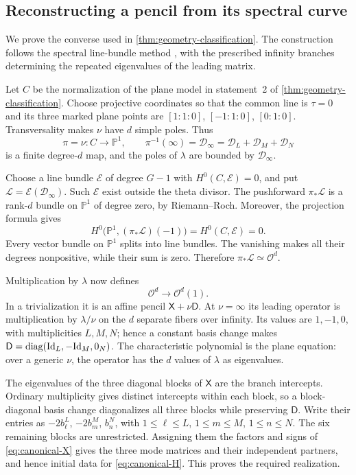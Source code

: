 \subsection{Reconstructing a pencil from its spectral curve}
\label{sec:geometry-converse}

We prove the converse used in \cref{thm:geometry-classification}.
The construction follows the spectral line-bundle method
\cite[\S1]{Beauville1990}, with the prescribed infinity branches
determining the repeated eigenvalues of the leading matrix.

Let $C$ be the normalization of the plane model in statement~2 of
\cref{thm:geometry-classification}. Choose projective coordinates so
that the common line is $\tau=0$ and its three marked plane points
are $[1:1:0]$, $[-1:1:0]$, $[0:1:0]$.
Transversality makes $\nu$ have $d$ simple poles. Thus
\[
 \pi=\nu:C\longrightarrow\mathbb P^1,\qquad
 \pi^{-1}(\infty)=\mathcal D_\infty
 =\mathcal D_L+\mathcal D_M+\mathcal D_N
\]
is a finite degree-$d$ map, and the poles of $\lambda$ are bounded
by $\mathcal D_\infty$.

Choose a line bundle $\mathcal E$ of degree $G-1$ with
$H^0(C,\mathcal E)=0$, and put
$\mathcal L=\mathcal E(\mathcal D_\infty)$. Such $\mathcal E$
exist outside the theta divisor. The pushforward $\pi_*\mathcal L$
is a rank-$d$ bundle on $\mathbb P^1$ of degree zero, by
Riemann--Roch. Moreover, the projection formula gives
\[
 H^0\bigl(\mathbb P^1,(\pi_*\mathcal L)(-1)\bigr)
 =H^0(C,\mathcal E)=0.
\]
Every vector bundle on $\mathbb P^1$ splits into line bundles.
The vanishing makes all their degrees nonpositive, while their sum
is zero. Therefore $\pi_*\mathcal L\simeq\mathcal O^{d}$.

Multiplication by $\lambda$ now defines
\[
 \mathcal O^{d}\longrightarrow\mathcal O^{d}(1).
\]
In a trivialization it is an affine pencil $\mathsf X+\nu\mathsf D$.
At $\nu=\infty$ its leading operator is multiplication by
$\lambda/\nu$ on the $d$ separate fibers over infinity. Its values
are $1,-1,0$, with multiplicities $L,M,N$; hence a constant basis
change makes $\mathsf D=\operatorname{diag}(\mathrm{Id}_L,-\mathrm{Id}_M,0_N)$.
The characteristic polynomial is the plane equation: over a generic
$\nu$, the operator has the $d$ values of $\lambda$ as eigenvalues.

The eigenvalues of the three diagonal blocks of $\mathsf X$ are
the branch intercepts. Ordinary multiplicity gives distinct
intercepts within each block, so a block-diagonal basis change
diagonalizes all three blocks while preserving $\mathsf D$.
Write their entries as $-2b_\ell^L$, $-2b_m^M$, $b_n^N$,
with $1\leq\ell\leq L$, $1\leq m\leq M$, $1\leq n\leq N$.
The six remaining blocks are unrestricted. Assigning them the
factors and signs of \cref{eq:canonical-X} gives the three mode
matrices and their independent partners, and hence initial data
for \cref{eq:canonical-H}. This proves the required realization.
